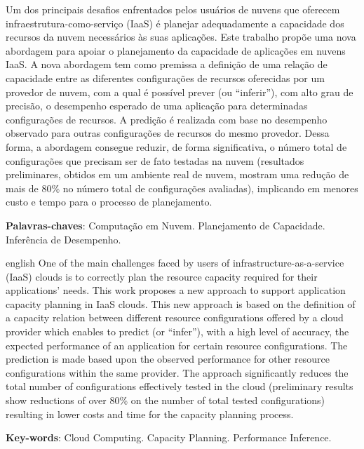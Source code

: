 \setlength{\absparsep}{18pt} %
\begin{resumo}
Um dos principais desafios enfrentados pelos usuários de nuvens que oferecem 
infraestrutura-como-serviço (IaaS) é planejar adequadamente a capacidade dos 
recursos da nuvem necessários às suas aplicações. Este trabalho propõe uma nova 
abordagem para apoiar o planejamento da capacidade de aplicações em nuvens IaaS. 
A nova abordagem tem como premissa a definição de uma relação de capacidade 
entre as diferentes configurações de recursos oferecidas por um provedor de nuvem, 
com a qual é possível prever (ou ``inferir''), com alto grau de precisão, o 
desempenho esperado de uma aplicação para determinadas configurações de recursos. 
A predição é realizada com base no desempenho observado para outras configurações 
de recursos do mesmo provedor. Dessa forma, a abordagem consegue reduzir, de 
forma significativa, o número total de configurações que precisam ser de fato 
testadas na nuvem (resultados preliminares, obtidos em um ambiente real de nuvem, 
mostram uma redução de mais de 80\% no número total de configurações avaliadas), 
implicando em menores custo e tempo para o processo de planejamento.

 \textbf{Palavras-chaves}: Computação em Nuvem. Planejamento de Capacidade. Inferência de Desempenho.
\end{resumo}

\begin{resumo}[Abstract]
 \begin{otherlanguage*}{english}
One of the main challenges faced by users of infrastructure-as-a-service (IaaS) 
clouds is to correctly plan the resource capacity required for their applications'
needs. This work proposes a new approach to support application capacity planning 
in IaaS clouds. This new approach is based on the definition of a capacity relation 
between different resource configurations offered by a cloud provider which enables 
to predict (or ``infer''), with a high level of accuracy, the expected performance 
of an application for certain resource configurations. The prediction is made based
upon the observed performance for other resource configurations within the same 
provider. The approach significantly reduces the total number of configurations 
effectively tested in the cloud (preliminary results show reductions of over 80\% 
on the number of total tested configurations) resulting in lower costs and time 
for the capacity planning process.

   \vspace{\onelineskip}
 
   \noindent 
   \textbf{Key-words}: Cloud Computing. Capacity Planning. Performance Inference.
 \end{otherlanguage*}
\end{resumo}
